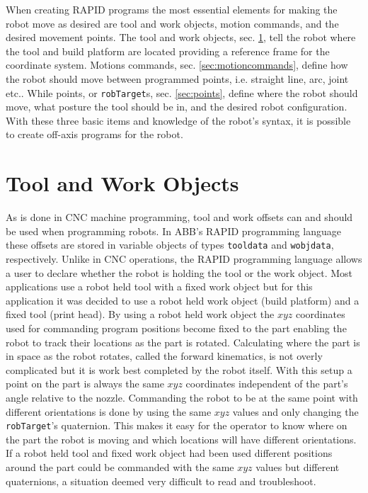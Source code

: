 \documentclass[main.tex]{subfiles}
\begin{document}
When creating RAPID programs the most essential elements for making the robot move as desired are tool and work objects, motion commands, and the desired movement points.
The tool and work objects, sec. \ref{sec:toolworkobjects}, tell the robot where the tool and build platform are located providing a reference frame for the coordinate system.
Motions commands, sec. \ref{sec:motioncommands}, define how the robot should move between programmed points, i.e. straight line, arc, joint etc..
While points, or \texttt{robTarget}s, sec. \ref{sec:points}, define where the robot should move, what posture the tool should be in, and the desired robot configuration.
With these three basic items and knowledge of the robot's syntax, it is possible to create off-axis programs for the robot.



\section{Tool and Work Objects}
\label{sec:toolworkobjects}
As is done in CNC machine programming, tool and work offsets can and should be used when programming robots.
In ABB's RAPID programming language these offsets are stored in variable objects of types \texttt{tooldata} and \texttt{wobjdata}, respectively.
Unlike in CNC operations, the RAPID programming language allows a user to declare whether the robot is holding the tool or the work object.
Most applications use a robot held tool with a fixed work object but for this application it was decided to use a robot held work object (build platform) and a fixed tool (print head).
By using a robot held work object the $xyz$ coordinates used for commanding program positions become fixed to the part enabling the robot to track their locations as the part is rotated.
Calculating where the part is in space as the robot rotates, called the forward kinematics, is not overly complicated but it is work best completed by the robot itself.
With this setup a point on the part is always the same $xyz$ coordinates independent of the part's angle relative to the nozzle.
Commanding the robot to be at the same point with different orientations is done by using the same $xyz$ values and only changing the \texttt{robTarget}'s quaternion.
This makes it easy for the operator to know where on the part the robot is moving and which locations will have different orientations.
If a robot held tool and fixed work object had been used different positions around the part could be commanded with the same $xyz$ values but different quaternions, a situation deemed very difficult to read and troubleshoot.
\end{document}
